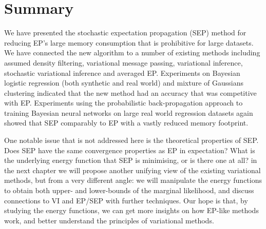 \section{Summary}
We have presented the stochastic expectation propagation (SEP) method for reducing EP's large memory consumption that is prohibitive for large datasets. We have connected the new algorithm to a number of existing methods including assumed density filtering, variational message passing, variational inference, stochastic variational inference and averaged EP.
%
Experiments on Bayesian logistic regression (both synthetic and real world) and mixture of Gaussians clustering indicated that the new method had an accuracy that was competitive with EP.  Experiments using the probabilistic back-propagation approach to training Bayesian neural networks on large real world regression datasets again showed that SEP comparably to EP with a vastly reduced memory footprint. 
%

One notable issue that is not addressed here is the theoretical properties of SEP. Does SEP have the same convergence properties as EP in expectation? What is the underlying energy function that SEP is minimising, or is there one at all? in the next chapter we will propose another unifying view of the existing variational methods, but from a very different angle: we will manipulate the energy functions to obtain both upper- and lower-bounds of the marginal likelihood, and discuss connections to VI and EP/SEP with further techniques. Our hope is that, by studying the energy functions, we can get more insights on how EP-like methods work, and better understand the principles of variational methods.


